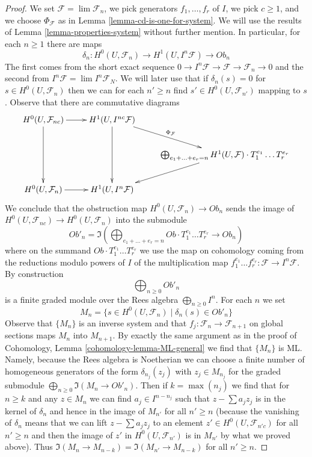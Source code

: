 \begin{proof}
\medskip\noindent
We set $\mathcal{F} = \lim \mathcal{F}_n$, we pick generators
$f_1, \ldots, f_r$ of $I$, we pick $c \geq 1$, and we choose
$\Phi_\mathcal{F}$ as in Lemma \ref{lemma-cd-is-one-for-system}.
We will use the results of Lemma \ref{lemma-properties-system}
without further mention. In particular, for each $n \geq 1$ there are maps
$$
\delta_n :
H^0(U, \mathcal{F}_n)
\longrightarrow
H^1(U, I^n\mathcal{F})
\longrightarrow
Ob_n
$$
The first comes from the short exact sequence
$0 \to I^n\mathcal{F} \to \mathcal{F} \to \mathcal{F}_n \to 0$
and the second from $I^n\mathcal{F} = \lim I^n\mathcal{F}_N$.
We will later use that if $\delta_n(s) = 0$ for $s \in H^0(U, \mathcal{F}_n)$
then we can for each $n' \geq n$ find $s' \in H^0(U, \mathcal{F}_{n'})$
mapping to $s$.
Observe that there are commutative diagrams
$$
\xymatrix{
H^0(U, \mathcal{F}_{nc}) \ar[r] \ar[dd] &
H^1(U, I^{nc}\mathcal{F}) \ar[dd] \ar[rd]^{\Phi_\mathcal{F}} \\
& &
\bigoplus_{e_1 + \ldots + e_r = n}
H^1(U, \mathcal{F}) \cdot T_1^{e_1} \ldots T_r^{e_r} \ar[ld] \\
H^0(U, \mathcal{F}_n) \ar[r] &
H^1(U, I^n\mathcal{F})
}
$$
We conclude that the obstruction map
$H^0(U, \mathcal{F}_n) \to Ob_n$
sends the image of
$H^0(U, \mathcal{F}_{nc}) \to H^0(U, \mathcal{F}_n)$
into the submodule
$$
Ob'_n =
\Im\left(
\bigoplus\nolimits_{e_1 + \ldots + e_r = n}
Ob \cdot T_1^{e_1} \ldots T_r^{e_r} \to Ob_n
\right)
$$
where on the summand $Ob \cdot T_1^{e_1} \ldots T_r^{e_r}$
we use the map on cohomology coming from the reductions modulo
powers of $I$ of the multiplication map
$f_1^{e_1} \ldots f_r^{e_r} : \mathcal{F} \to I^n\mathcal{F}$.
By construction
$$
\bigoplus\nolimits_{n \geq 0} Ob'_n
$$
is a finite graded module over the Rees algebra $\bigoplus_{n \geq 0} I^n$.
For each $n$ we set
$$
M_n = \{s \in H^0(U, \mathcal{F}_n) \mid \delta_n(s) \in Ob'_n\}
$$
Observe that $\{M_n\}$ is an inverse system and that
$f_j : \mathcal{F}_n \to \mathcal{F}_{n + 1}$ on global
sections maps $M_n$ into $M_{n + 1}$.
By exactly the same argument as in the proof of
Cohomology, Lemma \ref{cohomology-lemma-ML-general}
we find that $\{M_n\}$ is ML. Namely, because the Rees algebra
is Noetherian we can choose a finite number of homogeneous generators
of the form $\delta_{n_j}(z_j)$ with $z_j \in M_{n_j}$ for the graded submodule
$\bigoplus_{n \geq 0} \Im(M_n \to Ob'_n)$.
Then if $k = \max(n_j)$ we find that for $n \geq k$
and any $z \in M_n$ we can find $a_j \in I^{n - n_j}$ such that
$z - \sum a_j z_j$ is in the kernel of $\delta_n$
and hence in the image of $M_{n'}$ for all $n' \geq n$
(because the vanishing of $\delta_n$ means that we can
lift $z - \sum a_j z_j$ to an element $z' \in H^0(U, \mathcal{F}_{n'c})$
for all $n' \ge n$ and then the image of $z'$ in $H^0(U, \mathcal{F}_{n'})$
is in $M_{n'}$ by what we proved above).
Thus $\Im(M_n \to M_{n - k}) = \Im(M_{n'} \to M_{n - k})$
for all $n' \geq n$.


\end{proof}
